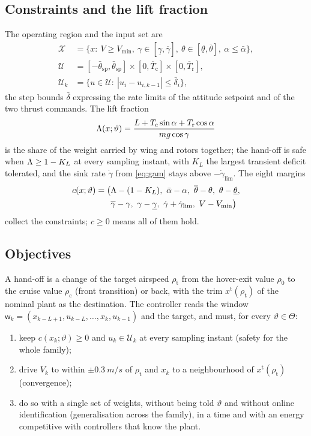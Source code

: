 \subsection{Constraints and the lift fraction}
The operating region and the input set are
\begin{align}
\mathcal X&=\{x:\ V\ge V_{\min},\ \gamma\in[\underline\gamma,\overline\gamma],\ \theta\in[\underline\theta,\overline\theta],\ \alpha\le\bar\alpha\},\label{eq:X}\\
\mathcal U&=[-\bar\theta_{\mathrm{sp}},\bar\theta_{\mathrm{sp}}]\times[0,\overline T_{\mathrm c}]\times[0,\overline T_{\mathrm r}],\nonumber\\ \mathcal U_k&=\{u\in\mathcal U:\ |u_i-u_{i,k-1}|\le\bar\delta_i\},\label{eq:U}
\end{align}
the step bounds $\bar\delta$ expressing the rate limits of the attitude setpoint and of the two thrust commands. The lift fraction
\begin{equation}\label{eq:lf}
\Lambda(x;\vartheta)=\frac{L+T_{\mathrm c}\sin\alpha+T_{\mathrm r}\cos\alpha}{mg\cos\gamma}
\end{equation}
is the share of the weight carried by wing and rotors together; the hand-off is safe when $\Lambda\ge1-K_L$ at every sampling instant, with $K_L$ the largest transient deficit tolerated, and the sink rate $\dot\gamma$ from \eqref{eq:gam} stays above $-\dot\gamma_{\lim}$. The eight margins
\begin{equation}\label{eq:c}
\begin{aligned}c(x;\vartheta)=\big(&\lf-(1-K_L),\ \bar\alpha-\alpha,\ \overline\theta-\theta,\ \theta-\underline\theta,\\ &\overline\gamma-\gamma,\ \gamma-\underline\gamma,\ \dot\gamma+\dot\gamma_{\lim},\ V-V_{\min}\big)\end{aligned}
\end{equation}
collect the constraints; $c\ge0$ means all of them hold.

\subsection{Objectives}
A hand-off is a change of the target airspeed $\rho_{\mathrm t}$ from the hover-exit value $\rho_0$ to the cruise value $\rho_{\mathrm c}$ (front transition) or back, with the trim $x^{\mathrm t}(\rho_{\mathrm t})$ of the nominal plant as the destination. The controller reads the window $\mathsf w_k=(x_{k-L+1},u_{k-L},\dots,x_k,u_{k-1})$ and the target, and must, for every $\vartheta\in\Theta$:
\begin{enumerate}[label=P\arabic*,leftmargin=2.2em]
\item keep $c(x_k;\vartheta)\ge0$ and $u_k\in\mathcal U_k$ at every sampling instant (safety for the whole family);
\item drive $V_k$ to within $\pm\SI{0.3}{m/s}$ of $\rho_{\mathrm t}$ and $x_k$ to a neighbourhood of $x^{\mathrm t}(\rho_{\mathrm t})$ (convergence);
\item do so with a single set of weights, without being told $\vartheta$ and without online identification (generalisation across the family), in a time and with an energy competitive with controllers that know the plant.
\end{enumerate}
